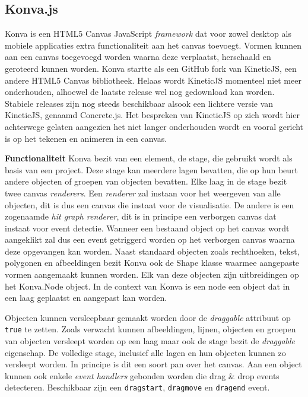 \subsection{Konva.js} 
Konva is een HTML5 Canvas JavaScript \textit{framework} dat voor zowel desktop als mobiele applicaties extra functionaliteit aan het canvas toevoegt. Vormen kunnen aan een canvas toegevoegd worden waarna deze verplaatst, herschaald en geroteerd kunnen worden. Konva startte als een GitHub fork van KineticJS, een andere HTML5 Canvas bibliotheek. Helaas wordt KineticJS momenteel niet meer onderhouden, alhoewel de laatste release wel nog gedownload kan worden. Stabiele releases zijn nog steeds beschikbaar alsook een lichtere versie van KineticJS, genaamd Concrete.js. Het bespreken van KineticJS op zich wordt hier achterwege gelaten aangezien het niet langer onderhouden wordt en vooral gericht is op het tekenen en animeren in een canvas.

\textbf{Functionaliteit} \break
Konva bezit van een element, de stage, die gebruikt wordt als basis van een project. Deze stage kan meerdere lagen bevatten, die op hun beurt andere objecten of groepen van objecten bevatten. Elke laag in de stage bezit twee canvas \textit{renderers}. Een \textit{renderer} zal instaan voor het weergeven van alle objecten, dit is dus een canvas die instaat voor de visualisatie. De andere is een zogenaamde \textit{hit graph renderer}, dit is in principe een verborgen canvas dat instaat voor event detectie. Wanneer een bestaand object op het canvas wordt aangeklikt zal dus een event getriggerd worden op het verborgen canvas waarna deze opgevangen kan worden. Naast standaard objecten zoals rechthoeken, tekst, polygonen en afbeeldingen bezit Konva ook de Shape klasse waarmee aangepaste vormen aangemaakt kunnen worden. Elk van deze objecten zijn uitbreidingen op het Konva.Node object. In de context van Konva is een node een object dat in een laag geplaatst en aangepast kan worden. 

Objecten kunnen versleepbaar gemaakt worden door de \textit{draggable} attribuut op \lstinline{true} te zetten. Zoals verwacht kunnen afbeeldingen, lijnen, objecten en groepen van objecten versleept worden op een laag maar ook de stage bezit de \textit{draggable} eigenschap. De volledige stage, inclusief alle lagen en hun objecten kunnen zo versleept worden. In principe is dit een soort pan over het canvas. Aan een object kunnen ook enkele \textit{event handlers} gebonden worden die drag \& drop events detecteren. Beschikbaar zijn een \lstinline{dragstart}, \lstinline{dragmove} en \lstinline{dragend} event. 

